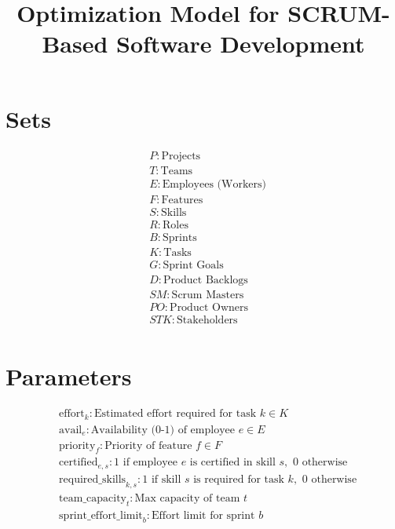 \documentclass{article}
\title{Optimization Model for SCRUM-Based Software Development}
\author{}
\date{}
\begin{document}
\maketitle

\section*{Sets}
\begin{align*}
& P: \text{Projects} \\
& T: \text{Teams} \\
& E: \text{Employees (Workers)} \\
& F: \text{Features} \\
& S: \text{Skills} \\
& R: \text{Roles} \\
& B: \text{Sprints} \\
& K: \text{Tasks} \\
& G: \text{Sprint Goals} \\
& D: \text{Product Backlogs} \\
& SM: \text{Scrum Masters} \\
& PO: \text{Product Owners} \\
& STK: \text{Stakeholders} \\
\end{align*}

\section*{Parameters}
\begin{align*}
& \text{effort}_{k}: \text{Estimated effort required for task } k \in K \\
& \text{avail}_{e}: \text{Availability (0-1) of employee } e \in E \\
& \text{priority}_{f}: \text{Priority of feature } f \in F \\
& \text{certified}_{e,s}: \text{1 if employee } e \text{ is certified in skill } s, \text{ 0 otherwise} \\
& \text{required\_skills}_{k,s}: \text{1 if skill } s \text{ is required for task } k, \text{ 0 otherwise} \\
& \text{team\_capacity}_{t}: \text{Max capacity of team } t \\
& \text{sprint\_effort\_limit}_{b}: \text{Effort limit for sprint } b \\
\end{align*}
\end{document}
